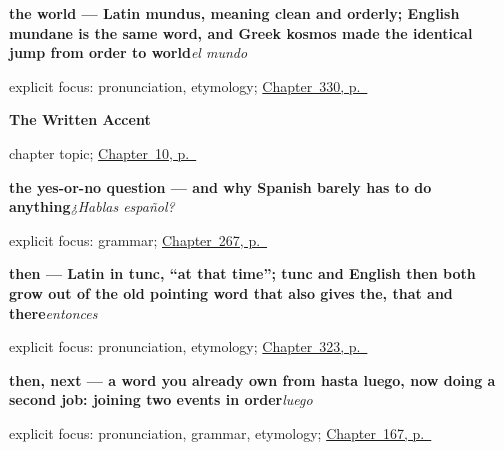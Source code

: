 \noindent\begin{minipage}[t]{\linewidth}
\raggedright
\textbf{the world — Latin mundus, meaning clean and orderly; English mundane is the same word, and Greek kosmos made the identical jump from order to world}\enspace\emph{el mundo}\par
\footnotesize explicit focus: pronunciation, etymology; \hyperref[ch:camino-y-vez]{Chapter~330, p.~\pageref*{ch:camino-y-vez}}
\end{minipage}\par\smallskip

\noindent\begin{minipage}[t]{\linewidth}
\raggedright
\textbf{The Written Accent}\par
\footnotesize chapter topic; \hyperref[ch:written-accent]{Chapter~10, p.~\pageref*{ch:written-accent}}
\end{minipage}\par\smallskip

\noindent\begin{minipage}[t]{\linewidth}
\raggedright
\textbf{the yes-or-no question — and why Spanish barely has to do anything}\enspace\emph{¿Hablas español?}\par
\footnotesize explicit focus: grammar; \hyperref[ch:es-negate-and-ask]{Chapter~267, p.~\pageref*{ch:es-negate-and-ask}}
\end{minipage}\par\smallskip

\noindent\begin{minipage}[t]{\linewidth}
\raggedright
\textbf{then — Latin in tunc, \textquotedblleft{}at that time\textquotedblright{}; tunc and English then both grow out of the old pointing word that also gives the, that and there}\enspace\emph{entonces}\par
\footnotesize explicit focus: pronunciation, etymology; \hyperref[ch:antes-y-despues]{Chapter~323, p.~\pageref*{ch:antes-y-despues}}
\end{minipage}\par\smallskip

\noindent\begin{minipage}[t]{\linewidth}
\raggedright
\textbf{then, next — a word you already own from hasta luego, now doing a second job: joining two events in order}\enspace\emph{luego}\par
\footnotesize explicit focus: pronunciation, grammar, etymology; \hyperref[ch:spanish-narrating]{Chapter~167, p.~\pageref*{ch:spanish-narrating}}
\end{minipage}\par\smallskip

